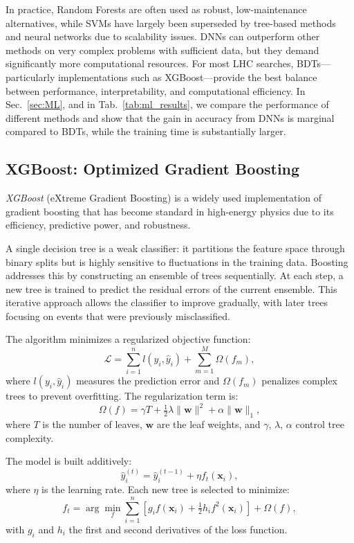 In practice, Random Forests are often used as robust, low-maintenance alternatives, while SVMs have largely been superseded by tree-based methods and neural networks due to scalability issues. DNNs can outperform other methods on very complex problems with sufficient data, but they demand significantly more computational resources. For most LHC searches, BDTs—particularly implementations such as XGBoost—provide the best balance between performance, interpretability, and computational efficiency. In Sec.~\ref{sec:ML}, and in Tab.~\ref{tab:ml_results}, we compare the performance of different methods and show that the gain in accuracy from DNNs is marginal compared to BDTs, while the training time is substantially larger.


\subsection{XGBoost: Optimized Gradient Boosting}
\label{ssec:xgboost}

\textit{XGBoost} (eXtreme Gradient Boosting) is a widely used implementation of gradient boosting that has become standard in high-energy physics due to its efficiency, predictive power, and robustness. 

A single decision tree is a weak classifier: it partitions the feature space through binary splits but is highly sensitive to fluctuations in the training data. Boosting addresses this by constructing an ensemble of trees sequentially. At each step, a new tree is trained to predict the residual errors of the current ensemble. This iterative approach allows the classifier to improve gradually, with later trees focusing on events that were previously misclassified.

The algorithm minimizes a regularized objective function:
\begin{equation}
\mathcal{L} = \sum_{i=1}^{n} l(y_i, \hat{y}_i) + \sum_{m=1}^{M} \Omega(f_m),
\end{equation}
where $l(y_i, \hat{y}_i)$ measures the prediction error and $\Omega(f_m)$ penalizes complex trees to prevent overfitting. The regularization term is:
\begin{equation}
\Omega(f) = \gamma T + \tfrac{1}{2}\lambda \|\mathbf{w}\|^2 + \alpha \|\mathbf{w}\|_1,
\end{equation}
where $T$ is the number of leaves, $\mathbf{w}$ are the leaf weights, and $\gamma$, $\lambda$, $\alpha$ control tree complexity.

The model is built additively:
\begin{equation}
\hat{y}_i^{(t)} = \hat{y}_i^{(t-1)} + \eta f_t(\mathbf{x}_i),
\end{equation}
where $\eta$ is the learning rate. Each new tree is selected to minimize:
\begin{equation}
f_t = \arg\min_{f} \sum_{i=1}^{n} \left[g_i f(\mathbf{x}_i) + \tfrac{1}{2} h_i f^2(\mathbf{x}_i)\right] + \Omega(f),
\end{equation}
with $g_i$ and $h_i$ the first and second derivatives of the loss function.

